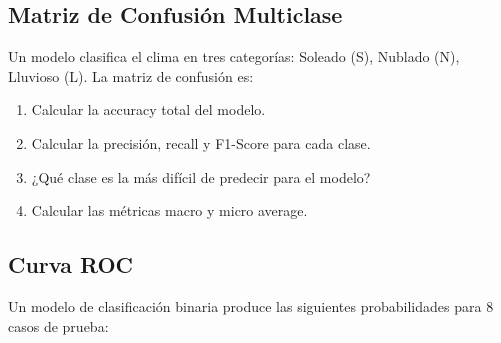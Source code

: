 \documentclass[12pt]{article}
\begin{document}
\subsection{Matriz de Confusión Multiclase}

Un modelo clasifica el clima en tres categorías: Soleado (S), Nublado (N), Lluvioso (L). La matriz de confusión es:

\begin{center}
\end{center}

\begin{enumerate}
    \item[a.] Calcular la accuracy total del modelo.
    \item[b.] Calcular la precisión, recall y F1-Score para cada clase.
    \item[c.] ¿Qué clase es la más difícil de predecir para el modelo?
    \item[d.] Calcular las métricas macro y micro average.
\end{enumerate}

\subsection{Curva ROC}

Un modelo de clasificación binaria produce las siguientes probabilidades para 8 casos de prueba:
\end{document}
